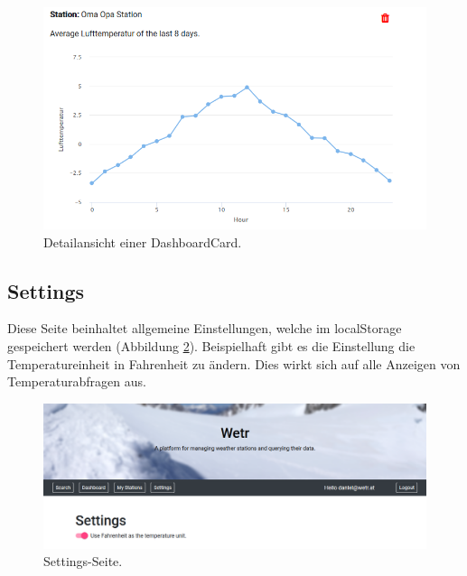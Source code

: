 \documentclass[12pt, letterpaper]{article}
\begin{document}
\begin{figure}[H]
    \centering
    \includegraphics[width=\textwidth]{img/dashboard/dashboard_card.png}
    \caption{Detailansicht einer DashboardCard.}
    \label{fig:dashboard_card}
\end{figure}

\subsection{Settings}

Diese Seite beinhaltet allgemeine Einstellungen, welche im localStorage gespeichert werden (Abbildung \ref{fig:settings}). Beispielhaft gibt es die Einstellung die Temperatureinheit in Fahrenheit zu ändern. Dies wirkt sich auf alle Anzeigen von Temperaturabfragen aus.

\begin{figure}[H]
    \centering
    \includegraphics[scale=0.7]{img/settings/settings.png}
    \caption{Settings-Seite.}
    \label{fig:settings}
\end{figure}
\end{document}
